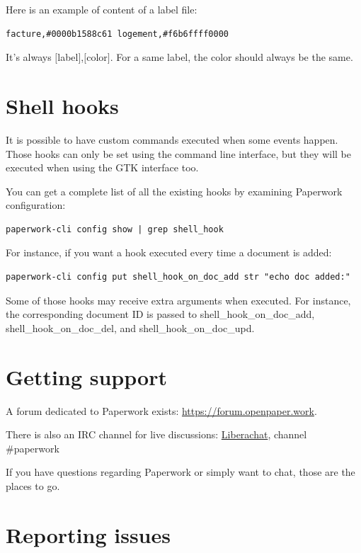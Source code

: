 \documentclass[10pt,a4paper]{article}
\begin{document}
Here is an example of content of a label file:
\begin{verbatim}
facture,#0000b1588c61 logement,#f6b6ffff0000
\end{verbatim}
It's always $[$label$]$,$[$color$]$. For a same label, the color should
always be the same.


\section{Shell hooks}

It is possible to have custom commands executed when some events happen.
Those hooks can only be set using the command line interface, but they
will be executed when using the GTK interface too.

You can get a complete list of all the existing hooks by examining Paperwork
configuration:

\begin{verbatim}
paperwork-cli config show | grep shell_hook
\end{verbatim}

For instance, if you want a hook executed every time a document is added:

\begin{verbatim}
paperwork-cli config put shell_hook_on_doc_add str "echo doc added:"
\end{verbatim}

Some of those hooks may receive extra arguments when executed. For instance,
the corresponding document ID is passed to shell\_hook\_on\_doc\_add,
shell\_hook\_on\_doc\_del, and shell\_hook\_on\_doc\_upd.


\section{Getting support}

A forum dedicated to Paperwork exists:
\href{https://forum.openpaper.work}{https://forum.openpaper.work}.

There is also an IRC channel for live discussions:
\href{https://web.libera.chat/}{Liberachat}, channel \#paperwork

If you have questions regarding Paperwork or simply want to chat, those are
the places to go.

\section{Reporting issues}
\end{document}

